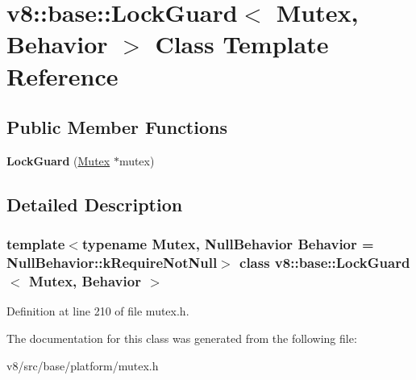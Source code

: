 \hypertarget{classv8_1_1base_1_1LockGuard}{}\section{v8\+:\+:base\+:\+:Lock\+Guard$<$ Mutex, Behavior $>$ Class Template Reference}
\label{classv8_1_1base_1_1LockGuard}
\subsection*{Public Member Functions}
\begin{DoxyCompactItemize}
\item 
\mbox{\label{classv8_1_1base_1_1LockGuard_a16415455bfe1454ab78b2264289e09fd}} 
{\bfseries Lock\+Guard} (\mbox{\hyperlink{classv8_1_1base_1_1Mutex}{Mutex}} $\ast$mutex)
\end{DoxyCompactItemize}


\subsection{Detailed Description}
\subsubsection*{template$<$typename Mutex, Null\+Behavior Behavior = Null\+Behavior\+::k\+Require\+Not\+Null$>$\newline
class v8\+::base\+::\+Lock\+Guard$<$ Mutex, Behavior $>$}



Definition at line 210 of file mutex.\+h.



The documentation for this class was generated from the following file\+:\begin{DoxyCompactItemize}
\item 
v8/src/base/platform/mutex.\+h\end{DoxyCompactItemize}
